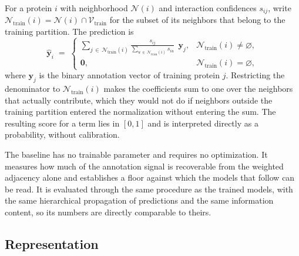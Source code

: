 \documentclass[Ingles]{ic-tese-v3}
\begin{document}
For a protein $i$ with neighborhood $\mathcal{N}(i)$ and interaction confidences $s_{ij}$, write
$\mathcal{N}_{\text{train}}(i) = \mathcal{N}(i) \cap \mathcal{V}_{\text{train}}$ for the subset of
its neighbors that belong to the training partition. The prediction is
\begin{equation}
  \hat{\mathbf{y}}_i \;=\;
  \begin{cases}
    \displaystyle\sum_{j \,\in\, \mathcal{N}_{\text{train}}(i)}
      \frac{s_{ij}}{\displaystyle\sum_{u \,\in\, \mathcal{N}_{\text{train}}(i)} s_{iu}}
      \;\, \mathbf{y}_j, & \mathcal{N}_{\text{train}}(i) \neq \varnothing, \\[16pt]
    \mathbf{0}, & \mathcal{N}_{\text{train}}(i) = \varnothing,
  \end{cases}
  \label{eq:met_baseline}
\end{equation}
\noindent where $\mathbf{y}_j$ is the binary annotation vector of training protein $j$. Restricting the
denominator to $\mathcal{N}_{\text{train}}(i)$ makes the coefficients sum to one over the neighbors
that actually contribute, which they would not do if neighbors outside the training partition
entered the normalization without entering the sum. The resulting score for a term lies in $[0,1]$
and is interpreted directly as a probability, without calibration.

The baseline has no trainable parameter and requires no optimization. It measures how much of the
annotation signal is recoverable from the weighted adjacency alone and establishes a floor against
which the models that follow can be read. It is evaluated through the same procedure as the trained
models, with the same hierarchical propagation of predictions and the same information content, so
its numbers are directly comparable to theirs.

\subsection{Representation}
\label{sec:met_perfil}
\end{document}
